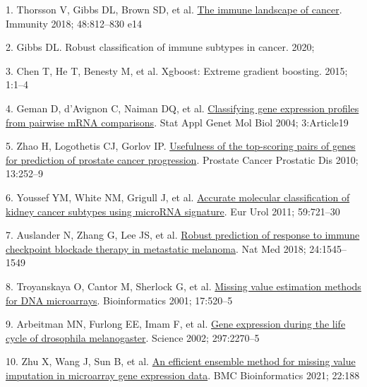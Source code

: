 \documentclass[
  12pt,
]{book}
\newlength{\cslhangindent}
\newlength{\cslentryspacingunit} %
\newenvironment{CSLReferences}[2] %
 {%
  \setlength{\parindent}{0pt}
  \ifodd #1
  \let\oldpar\par
  \def\par{\hangindent=\cslhangindent\oldpar}
  \fi
  \setlength{\parskip}{#2\cslentryspacingunit}
 }%
 {}
\begin{document}
\hypertarget{refs}{}
\begin{CSLReferences}{0}{0}
\leavevmode{}%
1. Thorsson V, Gibbs DL, Brown SD, et al. \href{https://doi.org/10.1016/j.immuni.2018.03.023}{The immune landscape of cancer}. Immunity 2018; 48:812--830 e14

\leavevmode{}%
2. Gibbs DL. Robust classification of immune subtypes in cancer. 2020;

\leavevmode{}%
3. Chen T, He T, Benesty M, et al. Xgboost: Extreme gradient boosting. 2015; 1:1--4

\leavevmode{}%
4. Geman D, d'Avignon C, Naiman DQ, et al. \href{https://doi.org/10.2202/1544-6115.1071}{Classifying gene expression profiles from pairwise mRNA comparisons}. Stat Appl Genet Mol Biol 2004; 3:Article19

\leavevmode{}%
5. Zhao H, Logothetis CJ, Gorlov IP. \href{https://doi.org/10.1038/pcan.2010.9}{Usefulness of the top-scoring pairs of genes for prediction of prostate cancer progression}. Prostate Cancer Prostatic Dis 2010; 13:252--9

\leavevmode{}%
6. Youssef YM, White NM, Grigull J, et al. \href{https://doi.org/10.1016/j.eururo.2011.01.004}{Accurate molecular classification of kidney cancer subtypes using microRNA signature}. Eur Urol 2011; 59:721--30

\leavevmode{}%
7. Auslander N, Zhang G, Lee JS, et al. \href{https://doi.org/10.1038/s41591-018-0157-9}{Robust prediction of response to immune checkpoint blockade therapy in metastatic melanoma}. Nat Med 2018; 24:1545--1549

\leavevmode{}%
8. Troyanskaya O, Cantor M, Sherlock G, et al. \href{https://doi.org/10.1093/bioinformatics/17.6.520}{Missing value estimation methods for DNA microarrays}. Bioinformatics 2001; 17:520--5

\leavevmode{}%
9. Arbeitman MN, Furlong EE, Imam F, et al. \href{https://doi.org/10.1126/science.1072152}{Gene expression during the life cycle of drosophila melanogaster}. Science 2002; 297:2270--5

\leavevmode{}%
10. Zhu X, Wang J, Sun B, et al. \href{https://doi.org/10.1186/s12859-021-04109-4}{An efficient ensemble method for missing value imputation in microarray gene expression data}. BMC Bioinformatics 2021; 22:188


\end{CSLReferences}
\end{document}
